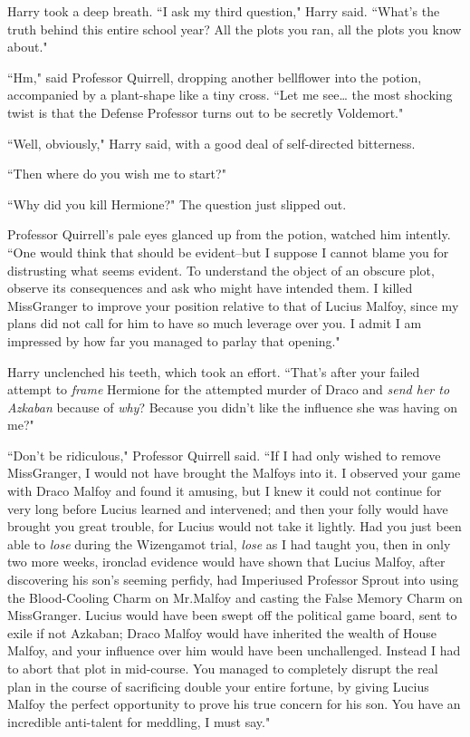 Harry took a deep breath. ``I ask my third question," Harry said. ``What's the truth behind this entire school year? All the plots you ran, all the plots you know about."

``Hm," said Professor Quirrell, dropping another bellflower into the potion, accompanied by a plant-shape like a tiny cross. ``Let me see{\ldots} the most shocking twist is that the Defense Professor turns out to be secretly Voldemort."

``Well, obviously," Harry said, with a good deal of self-directed bitterness.

``Then where do you wish me to start?"

``Why did you kill Hermione?" The question just slipped out.

Professor Quirrell's pale eyes glanced up from the potion, watched him intently. ``One would think that should be evident\---but I suppose I cannot blame you for distrusting what seems evident. To understand the object of an obscure plot, observe its consequences and ask who might have intended them. I killed Miss\?Granger to improve your position relative to that of Lucius Malfoy, since my plans did not call for him to have so much leverage over you. I admit I am impressed by how far you managed to parlay that opening."

Harry unclenched his teeth, which took an effort. ``That's after your failed attempt to \emph{frame} Hermione for the attempted murder of Draco and \emph{send her to Azkaban} because of \emph{why}? Because you didn't like the influence she was having on me?"

``Don't be ridiculous," Professor Quirrell said. ``If I had only wished to remove Miss\?Granger, I would not have brought the Malfoys into it. I observed your game with Draco Malfoy and found it amusing, but I knew it could not continue for very long before Lucius learned and intervened; and then your folly would have brought you great trouble, for Lucius would not take it lightly. Had you just been able to \emph{lose} during the Wizengamot trial, \emph{lose} as I had taught you, then in only two more weeks, ironclad evidence would have shown that Lucius Malfoy, after discovering his son's seeming perfidy, had Imperiused Professor Sprout into using the Blood-Cooling Charm on Mr.\?Malfoy and casting the False Memory Charm on Miss\?Granger. Lucius would have been swept off the political game board, sent to exile if not Azkaban; Draco Malfoy would have inherited the wealth of House Malfoy, and your influence over him would have been unchallenged. Instead I had to abort that plot in mid-course. You managed to completely disrupt the real plan in the course of sacrificing double your entire fortune, by giving Lucius Malfoy the perfect opportunity to prove his true concern for his son. You have an incredible anti-talent for meddling, I must say."

